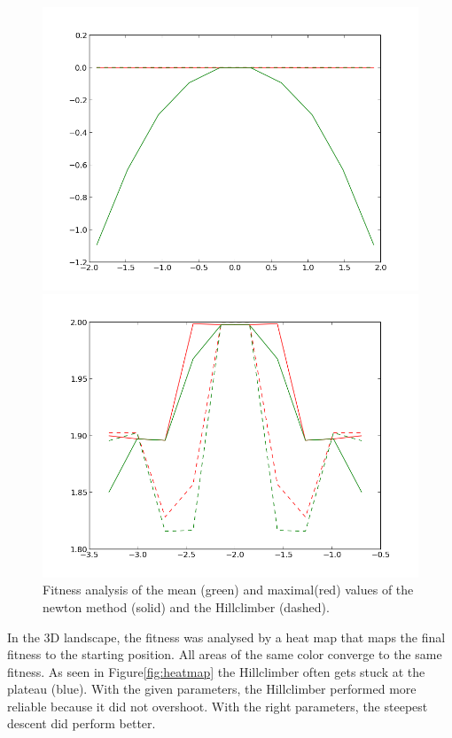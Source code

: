 \documentclass{scrartcl}
\begin{document}
\begin{figure}[H]
\centering
\begin{minipage}{.5\textwidth}
  \centering
  \includegraphics[width=.8\linewidth]{img/ex1/analysis_squared_newton_hill.png}
\end{minipage}%
\begin{minipage}{.5\textwidth}
  \centering
  \includegraphics[width=.8\linewidth]{img/ex1/analysis_trimodal_newton_hill.png}
\end{minipage}
\caption{Fitness analysis of the mean (green) and maximal(red) values of the newton method (solid) and the Hillclimber (dashed).}
\label{fig:2dminmax}
\end{figure}

In the 3D landscape, the fitness was analysed by a heat map that maps the final fitness to the starting position. All areas of the same color converge to the same fitness. As seen in Figure\ref{fig:heatmap} the Hillclimber often gets stuck at the plateau (blue). With the given parameters, the Hillclimber performed more reliable because it did not overshoot. With the right parameters, the steepest descent did perform better.
 
\end{document}

